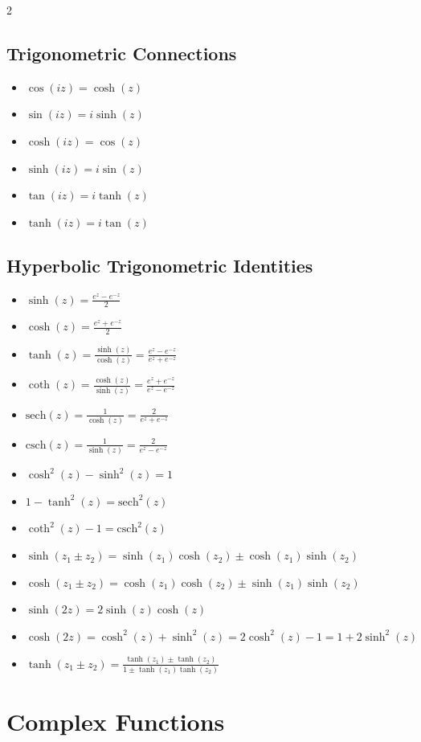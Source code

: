 \begin{multicols}{2}
\subsection*{Trigonometric Connections}
\begin{itemize}
\item $\cos(iz) = \cosh(z)$
\item $\sin(iz) = i\sinh(z)$
\item $\cosh(iz) = \cos(z)$
\item $\sinh(iz) = i\sin(z)$
\item $\tan(iz) = i\tanh(z)$
\item $\tanh(iz) = i\tan(z)$
\end{itemize}
\subsection*{Hyperbolic Trigonometric Identities}
\begin{itemize}
\item $\sinh(z) = \frac{e^z - e^{-z}}{2}$
\item $\cosh(z) = \frac{e^z + e^{-z}}{2}$
\item $\tanh(z) = \frac{\sinh(z)}{\cosh(z)} = \frac{e^z - e^{-z}}{e^z + e^{-z}}$
\item $\coth(z) = \frac{\cosh(z)}{\sinh(z)} = \frac{e^z + e^{-z}}{e^z - e^{-z}}$
\item $\text{sech}(z) = \frac{1}{\cosh(z)} = \frac{2}{e^z + e^{-z}}$
\item $\text{csch}(z) = \frac{1}{\sinh(z)} = \frac{2}{e^z - e^{-z}}$
\item $\cosh^2(z) - \sinh^2(z) = 1$
\item $1 - \tanh^2(z) = \text{sech}^2(z)$
\item $\coth^2(z) - 1 = \text{csch}^2(z)$
\item $\sinh(z_1 \pm z_2) = \sinh(z_1)\cosh(z_2) \pm \cosh(z_1)\sinh(z_2)$
\item $\cosh(z_1 \pm z_2) = \cosh(z_1)\cosh(z_2) \pm \sinh(z_1)\sinh(z_2)$
\item $\sinh(2z) = 2\sinh(z)\cosh(z)$
\item $\cosh(2z) = \cosh^2(z) + \sinh^2(z) = 2\cosh^2(z) - 1 = 1 + 2\sinh^2(z)$
\item $\tanh(z_1 \pm z_2) = \frac{\tanh(z_1) \pm \tanh(z_2)}{1 \pm \tanh(z_1)\tanh(z_2)}$
\end{itemize}
\section*{Complex Functions} 

\end{multicols}
